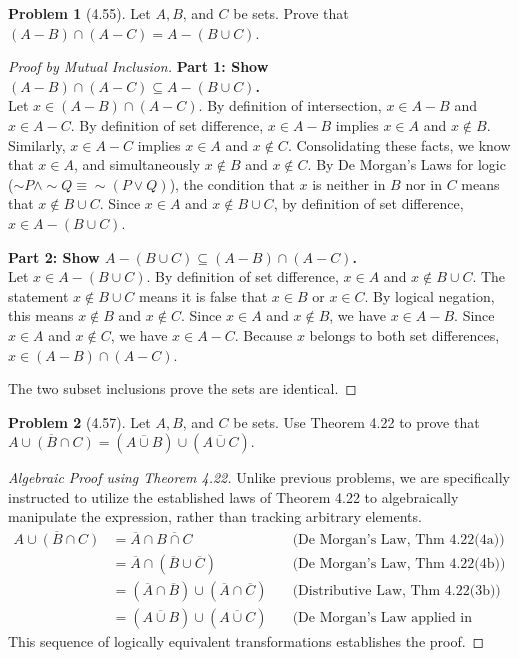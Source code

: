 \documentclass[11pt]{article}
\theoremstyle{definition}
\newtheorem{problem}{Problem}
\begin{document}
\begin{problem}[4.55]
Let $A, B$, and $C$ be sets. Prove that $(A - B) \cap (A - C) = A - (B \cup C)$.
\end{problem}
\begin{proof}[Proof by Mutual Inclusion]
\textbf{Part 1: Show $(A - B) \cap (A - C) \subseteq A - (B \cup C)$.} \\
Let $x \in (A - B) \cap (A - C)$. By definition of intersection, $x \in A - B$ and $x \in A - C$. 
By definition of set difference, $x \in A - B$ implies $x \in A$ and $x \notin B$. 
Similarly, $x \in A - C$ implies $x \in A$ and $x \notin C$. 
Consolidating these facts, we know that $x \in A$, and simultaneously $x \notin B$ and $x \notin C$. 
By De Morgan's Laws for logic ($\sim P \land \sim Q \equiv \sim(P \lor Q)$), the condition that $x$ is neither in $B$ nor in $C$ means that $x \notin B \cup C$. 
Since $x \in A$ and $x \notin B \cup C$, by definition of set difference, $x \in A - (B \cup C)$.

\vspace{2mm}
\noindent\textbf{Part 2: Show $A - (B \cup C) \subseteq (A - B) \cap (A - C)$.} \\
Let $x \in A - (B \cup C)$. By definition of set difference, $x \in A$ and $x \notin B \cup C$. 
The statement $x \notin B \cup C$ means it is false that $x \in B$ or $x \in C$. 
By logical negation, this means $x \notin B$ and $x \notin C$. 
Since $x \in A$ and $x \notin B$, we have $x \in A - B$. 
Since $x \in A$ and $x \notin C$, we have $x \in A - C$. 
Because $x$ belongs to both set differences, $x \in (A - B) \cap (A - C)$. 

The two subset inclusions prove the sets are identical.
\end{proof}

\begin{problem}[4.57]
Let $A, B$, and $C$ be sets. Use Theorem 4.22 to prove that $\overline{A \cup (B \cap C)} = (\overline{A \cup B}) \cup (\overline{A \cup C})$.
\end{problem}
\begin{proof}[Algebraic Proof using Theorem 4.22]
Unlike previous problems, we are specifically instructed to utilize the established laws of Theorem 4.22 to algebraically manipulate the expression, rather than tracking arbitrary elements.
\begin{align*}
\overline{A \cup (B \cap C)} &= \overline{A} \cap \overline{B \cap C} \quad &\text{(De Morgan's Law, Thm 4.22(4a))} \\
&= \overline{A} \cap (\overline{B} \cup \overline{C}) \quad &\text{(De Morgan's Law, Thm 4.22(4b))} \\
&= (\overline{A} \cap \overline{B}) \cup (\overline{A} \cap \overline{C}) \quad &\text{(Distributive Law, Thm 4.22(3b))} \\
&= (\overline{A \cup B}) \cup (\overline{A \cup C}) \quad &\text{(De Morgan's Law applied in reverse, Thm 4.22(4a))}
\end{align*}
This sequence of logically equivalent transformations establishes the proof.
\end{proof}
\end{document}
